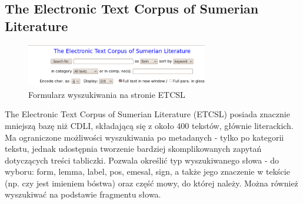 \subsection{The Electronic Text Corpus of Sumerian Literature \cite{etcsl}}
\begin{figure}[h]
 \centering
 \includegraphics[width=300px]{../diagramy/etcsl-search.png}
 \caption{Formularz wyszukiwania na stronie ETCSL}
 \label{fig:etcsl-search}
\end{figure}

The Electronic Text Corpus of Sumerian Literature (ETCSL) posiada znacznie mniejszą bazę niż CDLI,
składającą się z około 400 tekstów, głównie literackich.
Ma ograniczone możliwości wyszukiwania po metadanych - tylko po kategorii tekstu,
jednak udostępnia tworzenie bardziej skomplikowanych zapytań dotyczących treści tabliczki.
Pozwala określić typ wyszukiwanego słowa - do wyboru: form, lemma, label, pos, emesal, sign,
a także jego znaczenie w tekście (np. czy jest imieniem bóstwa) oraz część mowy, do której należy.
Można również wyszukiwać na podstawie fragmentu słowa.

